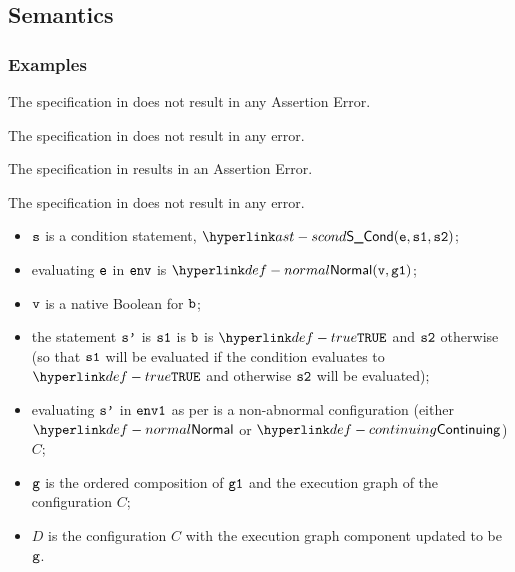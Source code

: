 \subsection{Semantics}
\subsubsection{Examples}
The specification in  does not result in any Assertion Error.

The specification in 
does not result in any error.

The specification in 
results in an Assertion Error.

The specification in  does not result in any error.

\ProseParagraph
\AllApply
\begin{itemize}
\item $\texttt{s}$ is a condition statement, $\SCond(\ve, \vsone, \vstwo)$;
\item evaluating $\texttt{e}$ in $\texttt{env}$ is $\Normal(\vv, \vgone)$\ProseOrAbnormal;
\item $\texttt{v}$ is a native Boolean for $\texttt{b}$;
\item the statement $\texttt{s'}$ is $\texttt{s1}$ is $\texttt{b}$ is $\True$ and $\texttt{s2}$ otherwise
(so that $\texttt{s1}$ will be evaluated if the condition evaluates to $\True$ and otherwise
$\texttt{s2}$ will be evaluated);
\item evaluating $\texttt{s'}$ in $\texttt{env1}$ as per  is a non-abnormal configuration
      (either $\Normal$ or $\Continuing$) $C$\ProseOrAbnormal;
\item $\texttt{g}$ is the ordered composition of $\texttt{g1}$ and the execution graph of the configuration $C$;
\item $D$ is the configuration $C$ with the execution graph component updated to be $\texttt{g}$.
\end{itemize}

